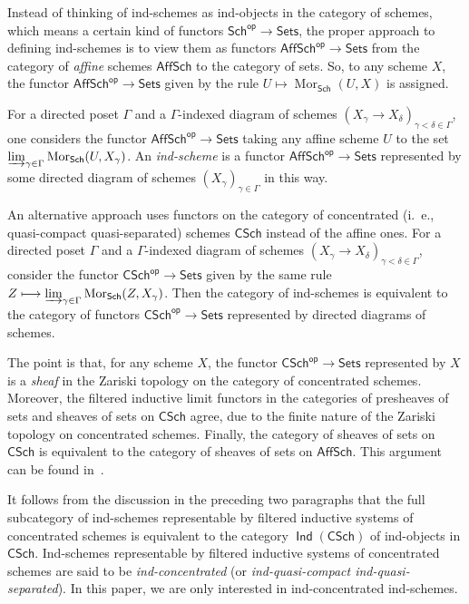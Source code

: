 \documentclass[12pt,a4paper]{amsart}
\newcommand{\+}{\protect\nobreakdash-}
\renewcommand{\:}{\colon}
\newcommand{\rarrow}{\longrightarrow}
\DeclareMathOperator{\Mor}{Mor}
\DeclareMathOperator{\Ind}{\mathsf{Ind}}
\newcommand{\Sets}{\mathsf{Sets}}
\newcommand{\Sch}{\mathsf{Sch}}
\newcommand{\AffSch}{\mathsf{AffSch}}
\newcommand{\CSch}{\mathsf{CSch}}
\newcommand{\sop}{\mathsf{op}}
\theoremstyle{plain}
\theoremstyle{definition}
\begin{document}
 Instead of thinking of ind-schemes as ind-objects in the category of
schemes, which means a certain kind of functors $\Sch^\sop\rarrow
\Sets$, the proper approach to defining ind-schemes is to view them as
functors $\AffSch^\sop\rarrow\Sets$ from the category of \emph{affine}
schemes $\AffSch$ to the category of sets.
 So, to any scheme $X$, the functor $\AffSch^\sop\rarrow\Sets$ given
by the rule $U\longmapsto\Mor_\Sch(U,X)$ is assigned.

 For a directed poset $\Gamma$ and a $\Gamma$\+indexed diagram of
schemes $(X_\gamma\to X_\delta)_{\gamma<\delta\in\Gamma}$, one
considers the functor $\AffSch^\sop\rarrow\Sets$ taking any affine
scheme $U$ to the set
$\varinjlim_{\gamma\in\Gamma}\Mor_\Sch(U,X_\gamma)$.
 An \emph{ind-scheme} is a functor $\AffSch^\sop\rarrow\Sets$
represented by some directed diagram of schemes
$(X_\gamma)_{\gamma\in\Gamma}$ in this way.

 An alternative approach uses functors on the category of concentrated
(i.~e., quasi-compact quasi-separated) schemes $\CSch$ instead of
the affine ones.
 For a directed poset $\Gamma$ and a $\Gamma$\+indexed diagram of
schemes $(X_\gamma\to X_\delta)_{\gamma<\delta\in\Gamma}$, consider
the functor $\CSch^\sop\rarrow\Sets$ given by the same rule
$Z\longmapsto\varinjlim_{\gamma\in\Gamma}\Mor_\Sch(Z,X_\gamma)$.
 Then the category of ind-schemes is equivalent to the category
of functors $\CSch^\sop\rarrow\Sets$ represented by directed diagrams
of schemes.

 The point is that, for any scheme $X$, the functor
$\CSch^\sop\rarrow\Sets$ represented by $X$ is a \emph{sheaf}
in the Zariski topology on the category of concentrated schemes.
 Moreover, the filtered inductive limit functors in the categories
of presheaves of sets and sheaves of sets on $\CSch$ agree, due to
the finite nature of the Zariski topology on concentrated schemes.
 Finally, the category of sheaves of sets on $\CSch$ is equivalent
to the category of sheaves of sets on $\AffSch$.
 This argument can be found in~\cite[Section~1.2]{Psemten}.

 It follows from the discussion in the preceding two paragraphs
that the full subcategory of ind-schemes representable by
filtered inductive systems of concentrated schemes is equivalent
to the category $\Ind(\CSch)$ of ind-objects in $\CSch$.
 Ind-schemes representable by filtered inductive systems of
concentrated schemes are said to be \emph{ind-concentrated}
(or \emph{ind-quasi-compact ind-quasi-separated}).
 In this paper, we are only interested in ind-concentrated ind-schemes.
\end{document}
